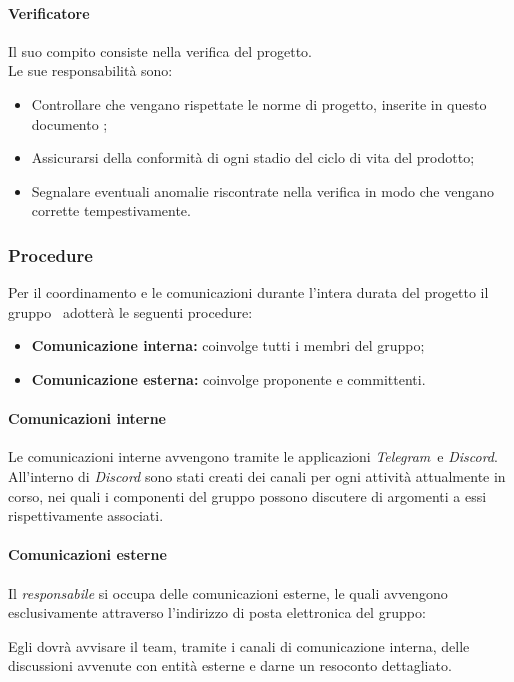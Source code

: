       \paragraph{Verificatore}
        Il suo compito consiste nella verifica del progetto.\\
        Le sue responsabilità sono:
        \begin{itemize}
          \item Controllare che vengano rispettate le norme di progetto, inserite in questo documento \docNameVersionNdP;
          \item Assicurarsi della conformità di ogni stadio del ciclo di vita del prodotto;
          \item Segnalare eventuali anomalie riscontrate nella verifica in modo che vengano corrette tempestivamente.
        \end{itemize}
  \subsubsection {Procedure}
  Per il coordinamento e le comunicazioni durante l'intera durata del progetto il gruppo \groupName\ adotterà le seguenti procedure:
  \begin{itemize}
    \item \textbf{Comunicazione interna:} coinvolge tutti i membri del gruppo;
    \item  \textbf{Comunicazione esterna:} coinvolge proponente e committenti.
  \end{itemize}
  \paragraph{Comunicazioni interne}
  Le comunicazioni interne avvengono tramite le applicazioni \textit{Telegram}\glo\ e \textit{Discord}\glo. All'interno di \textit{Discord} sono stati creati dei canali per ogni attività attualmente in corso, nei quali i componenti del gruppo possono discutere di argomenti a essi rispettivamente associati.
  \paragraph{Comunicazioni esterne}
  Il \textit{responsabile} si occupa delle comunicazioni esterne, le quali avvengono esclusivamente attraverso l'indirizzo di posta elettronica del gruppo:\\
  \begin{center}
    \groupEmail
  \end{center}
  Egli dovrà avvisare il team, tramite i canali di comunicazione interna, delle discussioni avvenute con entità esterne e darne un resoconto dettagliato.
